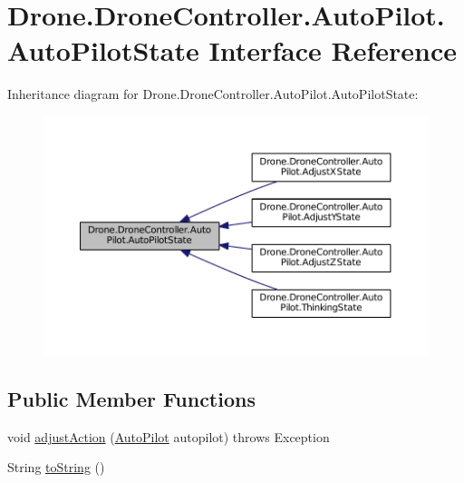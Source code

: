 \hypertarget{interface_drone_1_1_drone_controller_1_1_auto_pilot_1_1_auto_pilot_state}{}\section{Drone.\+Drone\+Controller.\+Auto\+Pilot.\+Auto\+Pilot\+State Interface Reference}
\label{interface_drone_1_1_drone_controller_1_1_auto_pilot_1_1_auto_pilot_state}


Inheritance diagram for Drone.\+Drone\+Controller.\+Auto\+Pilot.\+Auto\+Pilot\+State\+:\nopagebreak
\begin{figure}[H]
\begin{center}
\leavevmode
\includegraphics[width=350pt]{interface_drone_1_1_drone_controller_1_1_auto_pilot_1_1_auto_pilot_state__inherit__graph}
\end{center}
\end{figure}
\subsection*{Public Member Functions}
\begin{DoxyCompactItemize}
\item 
void \hyperlink{interface_drone_1_1_drone_controller_1_1_auto_pilot_1_1_auto_pilot_state_ae6fb0ba699d26333d2800f02bd6d1a33}{adjust\+Action} (\hyperlink{class_drone_1_1_drone_controller_1_1_auto_pilot_1_1_auto_pilot}{Auto\+Pilot} autopilot)  throws Exception
\item 
String \hyperlink{interface_drone_1_1_drone_controller_1_1_auto_pilot_1_1_auto_pilot_state_ac30fcebfe95c80d2d66d44dc7d46ebc3}{to\+String} ()
\end{DoxyCompactItemize}


